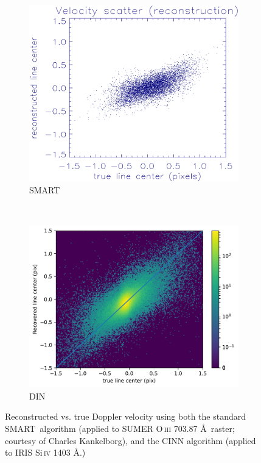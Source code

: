 \documentclass[10pt,letterpaper]{article}
\newcommand{\SMART}{\ac{SMART}}
\begin{document}
				\begin{figure}[h!]
					\centering
					\begin{subfigure}[t]{0.5\textwidth}
						\centering
						\includegraphics[width=\textwidth]{fig/smart_hist}
						\caption{SMART}
						\label{smart_hist}
					\end{subfigure}%
					~ 
					\begin{subfigure}[t]{0.5\textwidth}
						\centering
						\includegraphics[width=\textwidth]{fig/linearity}
						\caption{DIN}
						\label{din_hist}
					\end{subfigure}
					\caption{Reconstructed vs. true Doppler velocity using both the standard \SMART\ algorithm (applied to SUMER O\,\textsc{iii} 703.87 \AA\ raster; courtesy of Charles Kankelborg), and the CINN algorithm (applied to IRIS Si\,\textsc{iv} 1403 \AA.)}
					\label{dopp_hist}
				\end{figure}
				
\end{document}
